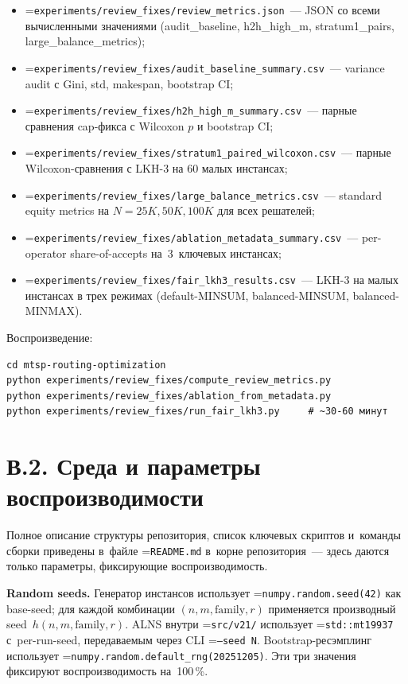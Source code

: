 \documentclass[a4paper,14pt]{extreport}
\makeatletter
\let\old@texttt\texttt
\renewcommand{\texttt}[1]{{\sloppy\hyphenchar\font=\m@ne\old@texttt{#1}}}
\makeatother
\begin{document}
\begin{itemize}
\item \texttt{experiments/review\_fixes/review\_metrics.json}~--- JSON со всеми вычисленными значениями (audit\_baseline, h2h\_high\_m, stratum1\_pairs, large\_balance\_metrics);
\item \texttt{experiments/review\_fixes/audit\_baseline\_summary.csv}~--- variance audit с Gini, std, makespan, bootstrap CI;
\item \texttt{experiments/review\_fixes/h2h\_high\_m\_summary.csv}~--- парные сравнения cap-фикса с Wilcoxon $p$ и bootstrap CI;
\item \texttt{experiments/review\_fixes/stratum1\_paired\_wilcoxon.csv}~--- парные Wilcoxon-сравнения с LKH-3 на 60 малых инстансах;
\item \texttt{experiments/review\_fixes/large\_balance\_metrics.csv}~--- standard equity metrics на $N = 25K, 50K, 100K$ для всех решателей;
\item \texttt{experiments/review\_fixes/ablation\_metadata\_summary.csv}~--- per-operator share-of-accepts на~3~ключевых инстансах;
\item \texttt{experiments/review\_fixes/fair\_lkh3\_results.csv}~--- LKH-3 на малых инстансах в трех режимах (default-MINSUM, balanced-MINSUM, balanced-MINMAX).
\end{itemize}

Воспроизведение:
{\footnotesize
\begin{verbatim}
cd mtsp-routing-optimization
python experiments/review_fixes/compute_review_metrics.py
python experiments/review_fixes/ablation_from_metadata.py
python experiments/review_fixes/run_fair_lkh3.py     # ~30-60 минут
\end{verbatim}
}

\section*{В.2. Среда и параметры воспроизводимости}

Полное описание структуры репозитория, список ключевых скриптов и~команды сборки приведены в~файле \texttt{README.md} в~корне репозитория~--- здесь даются только параметры, фиксирующие воспроизводимость.

\textbf{Random seeds.} Генератор инстансов использует \texttt{numpy.random.seed(42)} как base-seed; для каждой комбинации $(n,m,\text{family},r)$ применяется производный seed~$h(n,m,\text{family},r)$. ALNS внутри \texttt{src/v21/} использует \texttt{std::mt19937} с~per-run-seed, передаваемым через CLI \texttt{--seed N}. Bootstrap-ресэмплинг использует \texttt{numpy.random.default\_rng(20251205)}. Эти три значения фиксируют воспроизводимость на~100\,\%.
\end{document}
